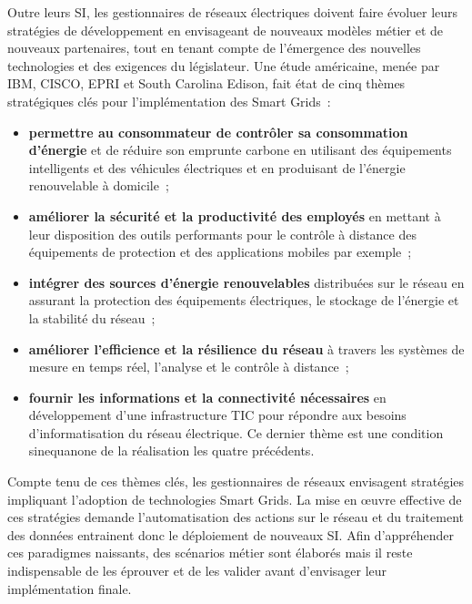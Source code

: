Outre leurs SI, les gestionnaires de réseaux électriques doivent faire évoluer 
leurs stratégies de développement en envisageant de nouveaux modèles métier et 
de nouveaux partenaires, tout en tenant compte de l'émergence des nouvelles 
technologies et des exigences du législateur. Une étude américaine, menée par 
IBM, CISCO, EPRI et South Carolina Edison, fait état de cinq thèmes stratégiques 
clés pour l'implémentation des Smart Grids~:
\begin{itemize}
\item \textbf{permettre au consommateur de contrôler sa consommation d'énergie} 
et de réduire son emprunte carbone en utilisant des équipements intelligents et 
des véhicules électriques et en produisant de l'énergie renouvelable à 
domicile~;
\item \textbf{améliorer la sécurité et la productivité des employés} en mettant 
à leur disposition des outils performants pour le contrôle à distance des 
équipements de protection et des applications mobiles par exemple~;
\item \textbf{intégrer des sources d'énergie renouvelables} distribuées sur le 
réseau en assurant la protection des équipements électriques, le stockage de 
l'énergie et la stabilité du réseau~;
\item \textbf{améliorer l'efficience et la résilience du réseau} à travers les 
systèmes de mesure en temps réel, l'analyse et le contrôle à distance~;
\item \textbf{fournir les informations et la connectivité nécessaires} en 
développement d'une infrastructure TIC pour répondre aux besoins 
d'informatisation du réseau électrique. Ce dernier thème est une condition 
sinequanone de la réalisation les quatre précédents.
\end{itemize}

Compte tenu de ces thèmes clés, les gestionnaires de réseaux envisagent 
stratégies impliquant l'adoption de technologies Smart Grids. 
La mise en œuvre effective de ces stratégies demande l'automatisation des 
actions sur le réseau et du traitement des données entrainent donc le 
déploiement de nouveaux SI. Afin d'appréhender ces paradigmes naissants, des 
scénarios métier sont élaborés mais il reste indispensable de les éprouver et de 
les valider avant d'envisager leur implémentation finale.

